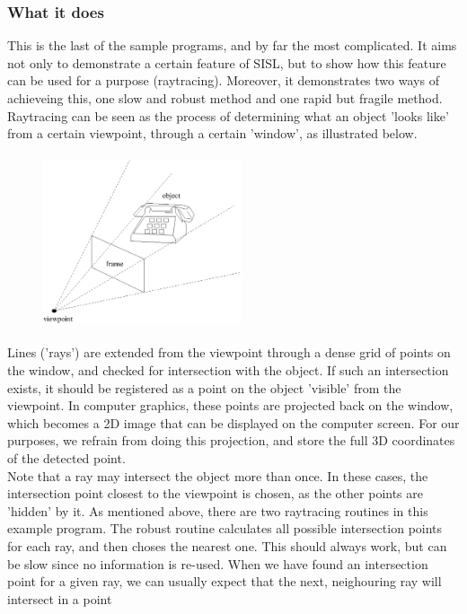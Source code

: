 \subsubsection{What it does}
This is the last of the sample programs, and by far the most complicated.  It aims not only to 
demonstrate a certain feature of SISL, but to show how this feature can be used for a purpose
(raytracing).  Moreover, it demonstrates two ways of achieveing this, one slow and robust method
and one rapid but fragile method. \\
Raytracing can be seen as the process of determining what an object 'looks like' from a 
certain viewpoint, through a certain 'window', as illustrated below.
\begin{figure}[h]
\begin{center}
\includegraphics[width=2.3in, height=2in,angle = 0]{raytracing.pdf}
\end{center}
\end{figure}
Lines ('rays') are extended from the viewpoint through a dense grid of points on the window,
and checked for intersection with the object.  If such an intersection exists, it should be 
registered as a point on the object 'visible' from the viewpoint.  In computer graphics, these 
points are projected back on the window, which becomes a 2D image that can be displayed on the
computer screen.  For our purposes, we refrain from doing this projection, and store the 
full 3D coordinates of the detected point.\\
Note that a ray may intersect the object more than once.  In these cases, the intersection point
closest to the viewpoint is chosen, as the other points are 'hidden' by it.  As mentioned above,
there are two raytracing routines in this example program.  The robust routine calculates all
possible intersection points for each ray, and then choses the nearest one.  This should always
work, but can be slow since no information is re-used.  When we have found an intersection point
for a given ray, we can usually expect that the next, neighouring ray will intersect in a point
